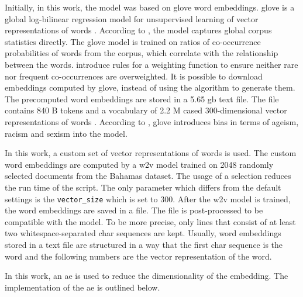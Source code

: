 Initially, in this work, the \infersent{} model was based on \acs{glove} word embeddings.
\acs{glove} is a global log-bilinear regression model for unsupervised learning of vector representations of words \cite{glove2014}. 
According to \citeauthor{glove2014}, the model captures global corpus statistics directly.
The \acs{glove} model is trained on ratios of co-occurrence probabilities of words from the corpus, 
which correlate with the relationship between the words. %
\citeauthor{glove2014} introduce rules for a weighting function to ensure neither rare nor frequent co-occurrences are overweighted.
It is possible to download embeddings computed by \acs{glove}, instead of using the algorithm to generate them.
The precomputed word embeddings are stored in a 5.65 \ac{gb} text file.
The file contains 840 B tokens and a vocabulary of 2.2 M cased 300-dimensional vector representations of words \cite{download-glove}.
According to \citeauthor{UniversalSentEnc2018}, \acs{glove} introduces bias in terms of ageism, racism and sexism into the model.

In this work, a custom set of vector representations of words is used.
The custom word embeddings are computed by a \ac{w2v} model trained on 2048 randomly selected documents from the Bahamas dataset.
The usage of a selection reduces the run time of the script.
The only parameter which differs from the default settings is the \texttt{vector\_size} which is set to 300.
After the \ac{w2v} model is trained, the word embeddings are saved in a file.
The file is post-processed to be compatible with the \infersent{} model.
To be more precise, only lines that consist of at least two whitespace-separated char sequences are kept.
Usually, word embeddings stored in a text file are structured in a way that 
the first char sequence is the word and the following numbers are the vector representation of the word.

In this work, an \ac{ae} is used to reduce the dimensionality of the \infersent{} embedding.
The implementation of the \ac{ae} is outlined below. %
